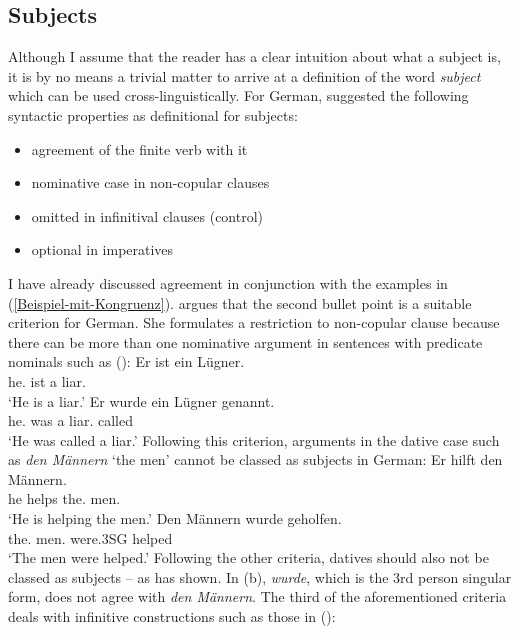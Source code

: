 {\subsection{Subjects}
\label{Abschnitt-Subjekt}

Although I assume that the reader has a clear intuition about what a subject is, it is by no means a trivial matter to arrive at a definition of
the word \emph{subject} which can be used cross-linguistically.
For German, \citet{Reis82} suggested the following syntactic properties as definitional for subjects:
\begin{itemize}
\item agreement of the finite verb with it
\item nominative case in non-copular clauses
\item omitted in infinitival clauses (control)
\item optional in imperatives
\end{itemize}
I have already discussed agreement in conjunction with the examples in
(\ref{Beispiel-mit-Kongruenz}). \citet{Reis82} argues that the second bullet point is a
suitable criterion for German. She formulates a restriction to non-copular clause because there
can be more than one nominative argument in sentences with predicate nominals such as ():
\eal
\ex
\gll Er ist ein Lügner.\\
     he.\nom{} ist a liar.\nom{}\\
\glt `He is a liar.'
\ex 
\gll Er wurde ein Lügner genannt.\\
     he.\nom{} was a liar.\nom{} called\\
\glt `He was called a liar.'
\zl
Following this criterion, arguments in the dative case such as \emph{den Männern} `the men' cannot be classed as subjects in German:
\eal
\ex 
\gll Er hilft den Männern.\\
	 he helps the.\dat{} men.\dat{}\\
\glt `He is helping the men.'
\ex
\label{bsp-den-maennern-wurde-geholfen}
\gll Den Männern wurde geholfen.\\
	 the.\dat{} men.\dat{} were.3SG helped\\
\glt `The men were helped.'
\zl
Following the other criteria, datives should also not be classed as subjects -- as \citet{Reis82} has shown.
In (b), \emph{wurde}, which is the 3rd person singular form, does not agree with \emph{den Männern}. The
third of the aforementioned criteria deals with infinitive constructions such as those in ():
}
